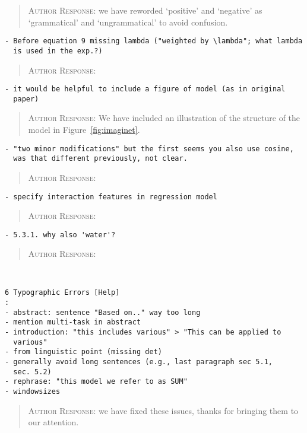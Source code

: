 \begin{quote}
\textsc{Author Response:}  we have reworded `positive' and `negative' as `grammatical' and `ungrammatical' to avoid confusion.
\end{quote}
\begin{verbatim}
- Before equation 9 missing lambda ("weighted by \lambda"; what lambda
  is used in the exp.?)
\end{verbatim}  
\begin{quote}
\textsc{Author Response:}  
\end{quote}
\begin{verbatim}
- it would be helpful to include a figure of model (as in original
  paper)
\end{verbatim}  
\begin{quote}
\textsc{Author Response:}  We have included an illustration of the structure of the model in Figure~\ref{fig:imaginet}.
\end{quote}
\begin{verbatim}
- "two minor modifications" but the first seems you also use cosine,
  was that different previously, not clear.
\end{verbatim}  
\begin{quote}
\textsc{Author Response:}  
\end{quote}
\begin{verbatim}
- specify interaction features in regression model
\end{verbatim}  
\begin{quote}
\textsc{Author Response:}  
\end{quote}
\begin{verbatim}
- 5.3.1. why also 'water'?
\end{verbatim}  
\begin{quote}
\textsc{Author Response:}  
\end{quote}
\begin{verbatim}


6 Typographic Errors [Help]
: 
- abstract: sentence "Based on.." way too long
- mention multi-task in abstract
- introduction: "this includes various" > "This can be applied to
  various"
- from linguistic point (missing det)
- generally avoid long sentences (e.g., last paragraph sec 5.1,
  sec. 5.2)
- rephrase: "this model we refer to as SUM"
- windowsizes
\end{verbatim}  
\begin{quote}
\textsc{Author Response:}  we have fixed these issues, thanks for bringing them to our attention.
\end{quote}
